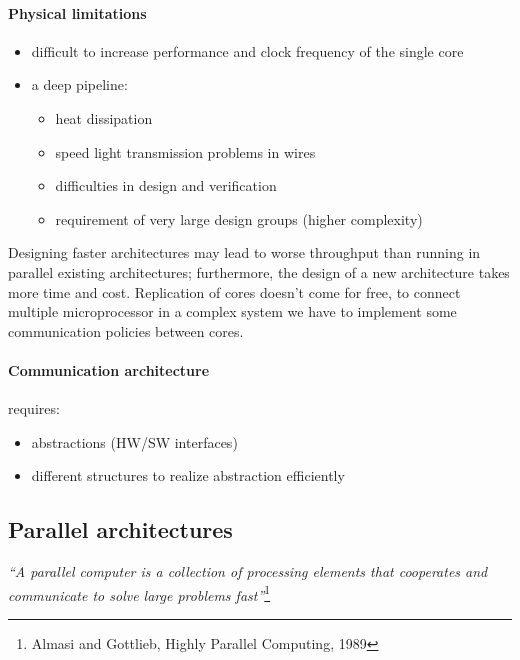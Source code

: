 \paragraph{Physical limitations}
\begin{itemize}
    \item difficult to increase performance and clock frequency of the single core
    \item a deep pipeline:
    \begin{itemize}
        \item heat dissipation
        \item speed light transmission problems in wires
        \item difficulties in design and verification
        \item requirement of very large design groups (higher complexity)
    \end{itemize}
\end{itemize}

Designing faster architectures may lead to worse throughput than running in parallel existing architectures;
furthermore, the design of a new architecture takes more time and cost.
Replication of cores doesn't come for free, to connect multiple microprocessor in a complex system we have to implement
some communication policies between cores.

\paragraph{Communication architecture} requires:
\begin{itemize}
    \item abstractions (HW/SW interfaces)
    \item different structures to realize abstraction efficiently
\end{itemize}

\subsection{Parallel architectures}\label{subsec:parallel-architecture}
\textit{“A parallel computer is a collection of
processing elements that cooperates and
communicate to solve large problems fast”}\footnote{Almasi and Gottlieb, Highly Parallel Computing, 1989}

